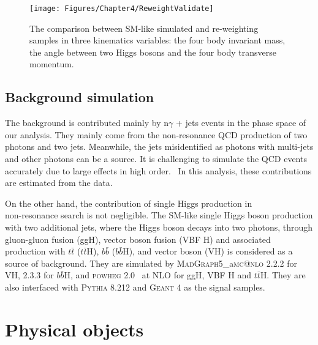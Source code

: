\begin{figure}[h]
  \centering
  \texttt{[image: Figures/Chapter4/ReweightValidate]}
  \caption{The comparison between SM-like simulated and re-weighting samples in three kinematics variables: the four body invariant mass, the angle between two Higgs bosons and the four body transverse momentum.~\cite{1710.08261}}
  \label{fig:ReweightValidate}
\end{figure}

\subsection{Background simulation} \label{sec:BkgMC}

The background is contributed mainly by n$\gamma$ + jets events in the phase space of our analysis.
They mainly come from the non-resonance QCD production of two photons and two jets.
Meanwhile, the jets misidentified as photons with multi-jets and other photons can be a source.
It is challenging to simulate the QCD events accurately due to large effects in high order.~\cite{1706.08309}
In this analysis, these contributions are estimated from the data.

On the other hand, the contribution of single Higgs production in \\ non-resonance search is not negligible.
The SM-like single Higgs boson production with two additional jets, where the Higgs boson decays into two photons, through gluon-gluon fusion (ggH), vector boson fusion (VBF H) and associated production with $t\bar{t}$ ($t\bar{t}$H), $b\bar{b}$ ($b\bar{b}$H), and vector boson (VH) is considered as a source of background.
They are simulated by {\textsc{MadGraph5}\_a\textsc{mc@nlo}\xspace} 2.2.2 for VH, 2.3.3 for $b\bar{b}$H, and {\textsc{powheg} 2.0}~\cite{hep-ph/0409146,0709.2092,1002.2581,1111.2854} at NLO for ggH, VBF H and $t\bar{t}$H.
They are also interfaced with {\textsc{Pythia 8.212}\xspace} and {\textsc{Geant 4}\xspace} as the signal samples.

\section{Physical objects}

